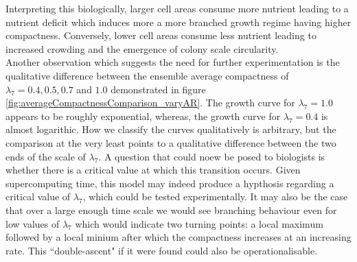Interpreting this biologically, larger cell areas consume more nutrient leading
to a nutrient deficit which induces more a more branched growth regime having higher 
compactness. Conversely, lower cell areas consume less nutrient leading 
to increased crowding and the emergence of colony scale circularity.
\\

Another observation which suggests the need for further experimentation is 
the qualitative difference between the ensemble average compactness of 
$\lambda_7 = 0.4, 0.5, 0.7$ and $1.0$ demonstrated in figure \ref{fig:averageCompactnessComparison_varyAR}.
The growth curve for $\lambda_7 = 1.0$ appears to be roughly exponential,
whereas, the growth curve for $\lambda_7 = 0.4$ is almost logarithic.
How we classify the curves qualitatively is arbitrary,
but the comparison at the very least points to a qualitative 
difference between the two ends of the scale of $\lambda_7$. A question 
that could noew be posed to biologists is whether there is a critical 
value at which this transition occurs. Given supercomputing 
time, this model may indeed produce a hypthosis regarding a critical value of $\lambda_7$,
which could be tested experimentally. It may also be the case that over a large enough 
time scale we would see branching behaviour even for low values of $\lambda_7$
which would indicate two turning points: a local maximum followed by a local minium after which 
the compactness increases at an increasing rate. This ``double-ascent" if 
it were found could also be operationalisable.


